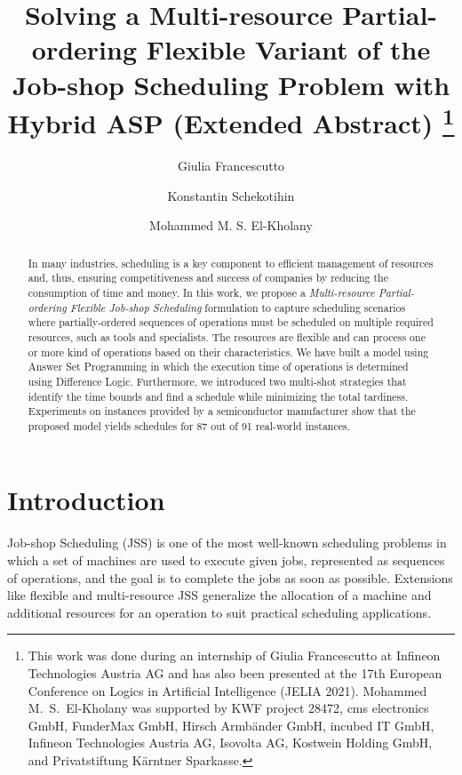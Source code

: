 \documentclass[submission,copyright,creativecommons]{eptcs}
\title{Solving a Multi-resource Partial-ordering Flexible Variant of the Job-shop Scheduling Problem with Hybrid ASP (Extended Abstract) \thanks{This work was done during an internship of Giulia Francescutto at Infineon Technologies Austria AG and has also been presented at the 17th European Conference on Logics in Artificial Intelligence (JELIA 2021).
Mohammed M.\ S.\ El-Kholany was supported by
KWF project 28472,
cms electronics GmbH,
FunderMax GmbH,
Hirsch Armbänder GmbH,
incubed IT GmbH,
Infineon Technologies Austria AG,
Isovolta AG,
Kostwein Holding GmbH, and
Privatstiftung Kärntner Sparkasse.}}
\author{Giulia Francescutto
\institute{Siemens AG {\"O}sterreich, Vienna, Austria}
\email{giulia.francescutto@siemens.com}
\and
Konstantin Schekotihin
\institute{University of Klagenfurt,
Klagenfurt, Austria}
\email{konstantin.schekotihin@aau.at}
\and
Mohammed M. S. El-Kholany
\institute{University of Klagenfurt, Klagenfurt, Austria}
\institute{Cairo University, Cairo, Egypt}
\email{mohammed.el-kholany@aau.at}
}
\newcommand{\jss}{MPF-JSS\xspace}
\begin{document}
\maketitle

\begin{abstract}
  In many industries, scheduling is a key component to efficient management of resources and, thus, ensuring competitiveness and success of companies by reducing the consumption of time and money. In this work, we propose a \emph{Multi-resource Partial-ordering Flexible Job-shop Scheduling} %
  formulation to capture scheduling scenarios where partially-ordered sequences of operations must be scheduled on multiple required resources, such as tools and specialists.
  The resources are flexible and can process one or more kind of operations based on their characteristics. We have built a model using Answer Set Programming %
  in which the execution time of operations is determined using Difference Logic. Furthermore, we introduced two multi-shot strategies that identify the time bounds and find a schedule while minimizing the total tardiness. 
  Experiments on %
  instances provided by a semiconductor manufacturer
  show that the proposed model %
  yields schedules for 87 out of 91 real-world instances.
\end{abstract}

\section{Introduction}
Job-shop Scheduling (JSS) \cite{johnson1954optimal} is one of the most well-known scheduling problems in which a set of machines are used to execute given jobs, represented as sequences of operations, and the goal is to complete the jobs as soon as possible.
Extensions like flexible \cite{brucker1990job} and multi-resource
\cite{DBLP:journals/eor/Dauzere-PeresRL98} JSS
generalize the allocation of a machine and additional resources for an operation
to suit practical scheduling applications.
\end{document}
